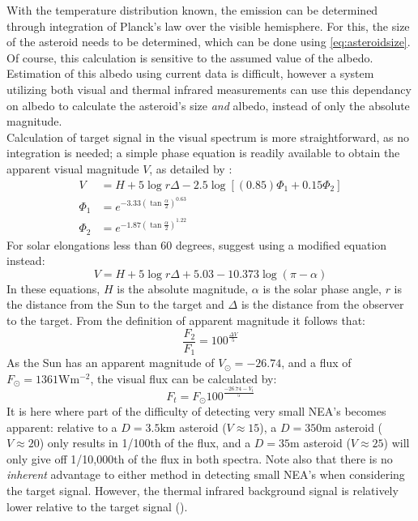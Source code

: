 With the temperature distribution known, the emission can be determined through integration of Planck's law over the visible hemisphere. For this, the size of the asteroid needs to be determined, which can be done using \autoref{eq:asteroidsize}. Of course, this calculation is sensitive to the assumed value of the albedo. Estimation of this albedo using current data is difficult, however a system utilizing both visual and thermal infrared measurements can use this dependancy on albedo to calculate the asteroid's size \textit{and} albedo, instead of only the absolute magnitude. \\

Calculation of target signal in the visual spectrum is more straightforward, as no integration is needed; a simple phase equation is readily available to obtain the apparent visual magnitude $V$, as detailed by \cite{2003NEOSDT}:
\begin{align}
 V &= H + 5 \log r \Delta - 2.5 \log \left[ (0.85) \Phi_1 + 0.15 \Phi_2 \right] \\
 \Phi_1 &= e^{-3.33\left(\tan \frac{\alpha}{2} \right)^{0.63}} \\
 \Phi_2 &= e^{-1.87\left(\tan \frac{\alpha}{2} \right)^{1.22}}
\end{align}
For solar elongations less than 60 degrees, \cite{2003NEOSDT} suggest using a modified equation instead:
\begin{equation}
 V = H + 5 \log r \Delta + 5.03 - 10.373 \log (\pi - \alpha)
\end{equation}
In these equations, $H$ is the absolute magnitude, $\alpha$ is the solar phase angle, $r$ is the distance from the Sun to the target and $\Delta$ is the distance from the observer to the target. From the definition of apparent magnitude it follows that:
\begin{equation}
 \frac{F_2}{F_1} = 100^{\frac{\Delta V}{5}}
\end{equation}
As the Sun has an apparent magnitude of $V_\odot = -26.74$, and a flux of $F_\odot = 1361 \mathrm{W}\mathrm{m}^{-2}$, the visual flux can be calculated by:
\begin{equation}
 F_t = F_\odot 100^{\frac{-26.74 - V_t}{5}}
\end{equation}
It is here where part of the difficulty of detecting very small NEA's becomes apparent: relative to a $D = 3.5 \mathrm{km}$ asteroid ($V \approx 15$), a $D = 350 \mathrm{m}$ asteroid ($V \approx 20$) only results in 1/100th of the flux, and a $D = 35 \mathrm{m}$ asteroid ($V \approx 25$) will only give off 1/10,000th of the flux in both spectra. Note also that there is no \textit{inherent} advantage to either method in detecting small NEA's when considering the target signal. However, the thermal infrared background signal is relatively lower relative to the target signal (\cite{2003NEOSDT}).


